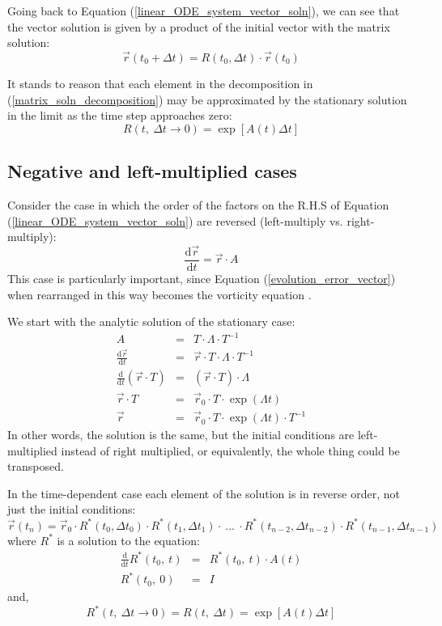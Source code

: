 \documentclass[11pt]{article}
\begin{document}
Going back to Equation (\ref{linear_ODE_system_vector_soln}), we can
see that the vector solution is given by a product of the initial vector with
the matrix solution:
\begin{equation}
\vec r(t_0+\Delta t)=R(t_0, \Delta t) \cdot \vec r(t_0)
\end{equation}

It stands to reason that each element in the decomposition in (\ref{matrix_soln_decomposition})
may be approximated by the stationary solution in the limit as the time step
approaches zero:
\begin{equation}
R(t, ~ \Delta t \rightarrow 0) = \exp \left [ A(t) \Delta t \right ]
\end{equation}

\subsection{Negative and left-multiplied cases}

Consider the case in which the order of the factors on the R.H.S of Equation 
(\ref{linear_ODE_system_vector_soln}) are reversed (left-multiply vs. right-multiply):
\begin{equation}
\frac{\mathrm d \vec r}{\mathrm d t} = \vec r \cdot A
\end{equation}
This case is particularly important, since Equation (\ref{evolution_error_vector})
when rearranged in this way becomes the vorticity equation \citep{Acheson1990}.

We start with the analytic solution of the stationary case:
\begin{eqnarray}
  A & = & T \cdot \Lambda \cdot T^{-1} \\
  \frac{\mathrm d \vec r}{\mathrm d t} & = & \vec r \cdot T \cdot \Lambda \cdot T^{-1} \\
  \frac{\mathrm d}{\mathrm d t} (\vec r \cdot T) & = & (\vec r \cdot T) \cdot \Lambda \\
  \vec r \cdot T & = & \vec r_0 \cdot T \cdot \exp (\Lambda t) \\
	\vec r & = & \vec r_0 \cdot T \cdot \exp (\Lambda t) \cdot T^{-1}
\end{eqnarray}
In other words, the solution is the same, but the initial conditions are
left-multiplied instead of right multiplied, or equivalently, the whole thing 
could be transposed.

In the time-dependent case each element of the solution is in reverse order,
not just the initial conditions:
\begin{equation}
\vec r(t_n) = \vec r_0 \cdot R^*(t_0,\Delta t_0) \cdot R^*(t_1, \Delta t_1) \cdot ~ ... 
~ \cdot R^*(t_{n-2},\Delta t_{n-2}) \cdot R^*(t_{n-1},\Delta t_{n-1})
\end{equation}
where $R^*$ is a solution to the equation:
\begin{eqnarray}
\frac{\mathrm d}{\mathrm d t}R^*(t_0,~t) & = & R^*(t_0, ~t) \cdot A(t) \\
R^*(t_0, ~ 0) & = & I
\end{eqnarray}
and,
\begin{equation}
R^*(t,~\Delta t \rightarrow 0) = R(t,~ \Delta t ) 
 = \exp \left [ A(t) \Delta t \right ]
\end{equation}
\end{document}
